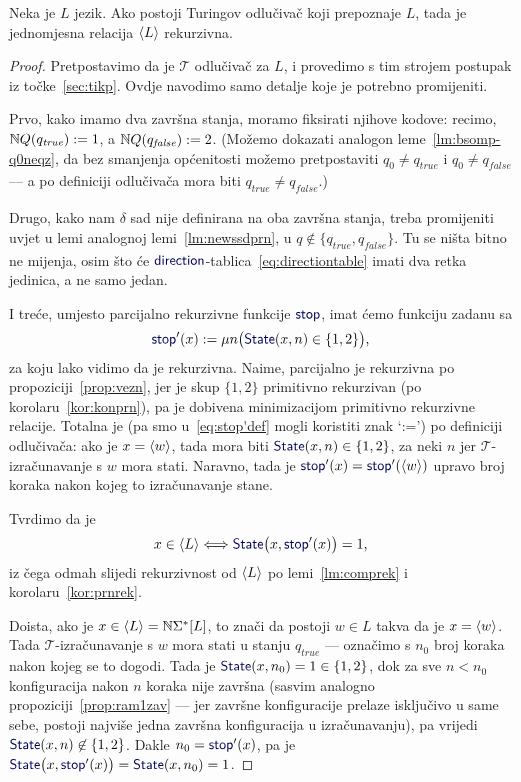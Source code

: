 \begin{teorem}\label{tm:oikr}
Neka je $L$ jezik. Ako postoji Turingov odlučivač koji prepoznaje $L$, tada je jednomjesna relacija $\langle L\rangle$ rekurzivna.
\end{teorem}
\begin{proof}
Pretpostavimo da je $\mathcal T$ odlučivač za $L$, i provedimo s tim strojem postupak iz točke~\ref{sec:tikp}. Ovdje navodimo samo detalje koje je potrebno promijeniti.

Prvo, kako imamo dva završna stanja, moramo fiksirati njihove kodove: recimo, ${\mathbb N} Q(q_\mathit{true}):=1$, a ${\mathbb N} Q(q_\mathit{false}):=2$. (Možemo dokazati analogon leme~\ref{lm:bsomp-q0neqz}, da bez smanjenja općenitosti možemo pretpostaviti $q_0\not=q_\mathit{true}$ i $q_0\not=q_\mathit{false}$ --- a po definiciji odlučivača mora biti $q_\mathit{true}\not=q_\mathit{false}$.)

Drugo, kako nam $\delta$ sad nije definirana na oba završna stanja, treba promijeniti uvjet u lemi analognoj lemi~\ref{lm:newssdprn}, u $q\not\in\{q_\mathit{true},q_\mathit{false}\}$. Tu se ništa bitno ne mijenja, osim što će $\f{direction}$-tablica~\eqref{eq:directiontable} imati dva retka jedinica, a ne samo jedan.

I treće, umjesto parcijalno rekurzivne funkcije $\f{stop}$, imat ćemo funkciju zadanu sa
\begin{equation}\label{eq:stop'def}
    \f{stop}'(x):=\mu n\bigl(\f{State}(x,n)\in\{1,2\}\bigr)\text,
\end{equation}
za koju lako vidimo da je rekurzivna. Naime, parcijalno je rekurzivna po propoziciji~\ref{prop:vezn}, jer je skup $\{1,2\}$ primitivno rekurzivan (po korolaru~\ref{kor:konprn}), pa je dobivena minimizacijom primitivno rekurzivne relacije. Totalna je (pa smo u~\eqref{eq:stop'def} mogli koristiti znak `:=') po definiciji odlučivača: ako je $x=\langle w\rangle$, tada mora biti $\f{State}(x,n)\in\{1,2\}$, za neki $n$ jer $\mathcal T$-izračunavanje s $w$ mora stati.
Naravno, tada je $\f{stop}'(x)=\f{stop}'(\kr w)$ upravo broj koraka nakon kojeg to iz\-ra\-ču\-na\-va\-nje stane.

Tvrdimo da je
\begin{equation}
    x\in\kr L\Longleftrightarrow\f{State}\bigl(x,\f{stop}'(x)\bigr)=1\text,
\end{equation}
iz čega odmah slijedi rekurzivnost od $\langle L\rangle$ po lemi~\ref{lm:comprek} i korolaru~\ref{kor:prnrek}. 

Doista, ako je $x\in\langle L\rangle={\mathbb N}\Sigma^*[L]$, to znači da postoji $w\in L$ takva da je $x=\langle w\rangle$. Tada $\mathcal T$-izračunavanje s $w$ mora stati u stanju $q_\mathit{true}$ --- označimo s $n_0$ broj koraka nakon kojeg se to dogodi. Tada je $\f{State}(x,n_0)=1\in\{1,2\}$, dok za sve $n<n_0$ konfiguracija nakon $n$ koraka nije završna (sasvim analogno propoziciji~\ref{prop:ram1zav} --- jer završne konfiguracije prelaze isključivo u same sebe, postoji najviše jedna završna konfiguracija u izračunavanju), pa vrijedi $\f{State}(x,n)\not\in\{1,2\}$. Dakle $n_0=\f{stop}'(x)$, pa je $\f{State}\bigl(x,\f{stop}'(x)\bigr)=\f{State}(x,n_0)=1$.


\end{proof}
